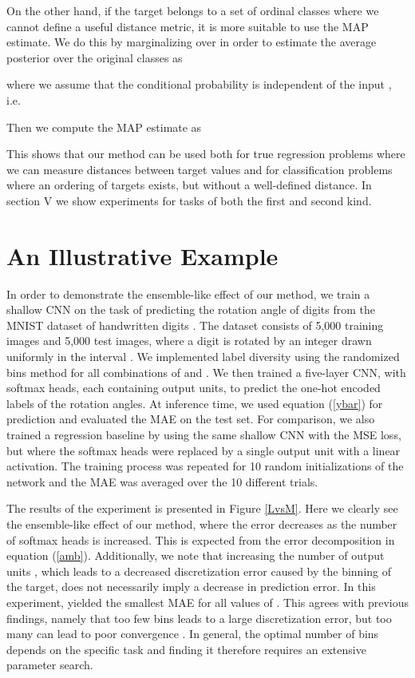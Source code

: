 \documentclass[10pt, conference, a4paper]{IEEEtran}
\begin{document}
On the other hand, if the target belongs to a set of ordinal classes where we cannot define a useful distance metric, it is more suitable to use the MAP estimate. We do this by marginalizing over  in order to estimate the average posterior over the original classes  as


where we assume that the conditional probability  is independent of the input , i.e.

Then we compute the MAP estimate as 

This shows that our method can be used both for true regression problems where we can measure distances between target values and for classification problems where an ordering of targets exists, but without a well-defined distance. In section V we show experiments for tasks of both the first and second kind.










\section{An Illustrative Example}
In order to demonstrate the ensemble-like effect of our method, we train a shallow CNN on the task of predicting the rotation angle of digits from the MNIST dataset of handwritten digits \cite{lecun1998mnist}. The dataset consists of 5,000 training images and 5,000 test images, where a digit is rotated by an integer drawn uniformly in the interval . We implemented label diversity using the randomized bins method for all combinations of  and . We then trained a five-layer CNN, with  softmax heads, each containing  output units, to predict the one-hot encoded labels of the rotation angles. At inference time, we used equation (\ref{ybar}) for prediction and evaluated the MAE on the test set. For comparison, we also trained a regression baseline by using the same shallow CNN with the MSE loss, but where the softmax heads were replaced by a single output unit with a linear activation. The training process was repeated for 10 random initializations of the network and the MAE was averaged over the 10 different trials.

The results of the experiment is presented in Figure \ref{LvsM}. Here we clearly see the ensemble-like effect of our method, where the error decreases as the number of softmax heads  is increased. This is expected from the error decomposition in equation (\ref{amb}). Additionally, we note that increasing the number of output units , which leads to a decreased discretization error caused by the binning of the target, does not necessarily imply a decrease in prediction error. In this experiment,  yielded the smallest MAE for all values of . This agrees with previous findings, namely that too few bins leads to a large discretization error, but too many can lead to poor convergence \cite{diaz2019soft, fu2018deep}. In general, the optimal number of bins depends on the specific task and finding it therefore requires an extensive parameter search.
\end{document}
